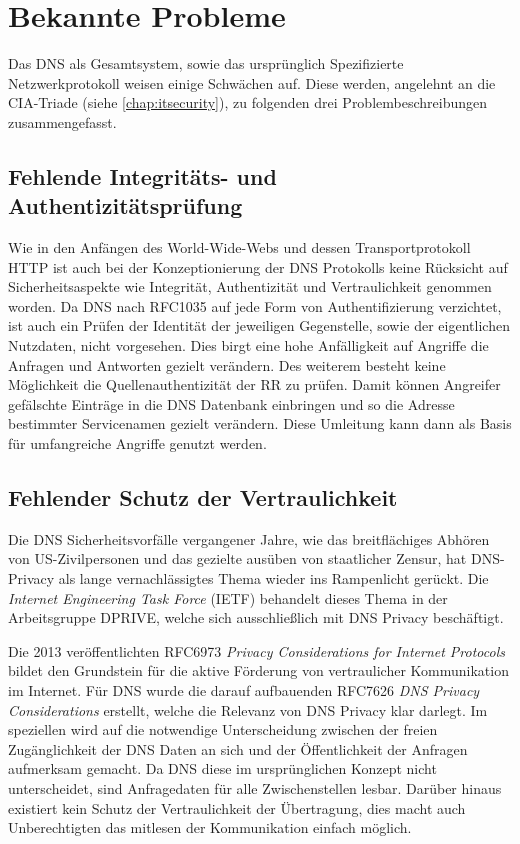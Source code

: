 \chapter{Bekannte Probleme}
\label{chap:threads}

Das DNS als Gesamtsystem, sowie das ursprünglich Spezifizierte Netzwerkprotokoll weisen einige Schwächen auf. Diese werden, angelehnt an die CIA-Triade (siehe \ref{chap:itsecurity}), zu folgenden drei Problembeschreibungen zusammengefasst.   

\section{Fehlende Integritäts- und Authentizitätsprüfung}
\label{sec:thread-auth}

Wie in den Anfängen des World-Wide-Webs und dessen Transportprotokoll HTTP ist auch bei der Konzeptionierung der DNS Protokolls keine Rücksicht auf Sicherheitsaspekte wie Integrität, Authentizität und Vertraulichkeit genommen worden. Da DNS nach RFC1035\cite{rfc1035} auf jede Form von Authentifizierung verzichtet, ist auch ein Prüfen der Identität der jeweiligen Gegenstelle, sowie der eigentlichen Nutzdaten, nicht vorgesehen. Dies birgt eine hohe Anfälligkeit auf Angriffe die Anfragen und Antworten gezielt verändern. Des weiterem besteht keine Möglichkeit die Quellenauthentizität der RR zu prüfen. Damit können Angreifer gefälschte Einträge in die DNS Datenbank einbringen und so die Adresse bestimmter Servicenamen gezielt verändern. Diese Umleitung kann dann als Basis für umfangreiche Angriffe genutzt werden.

\section{Fehlender Schutz der Vertraulichkeit}
\label{sec:thread-priv}

Die DNS Sicherheitsvorfälle vergangener Jahre, wie das breitflächiges Abhören von US-Zivilpersonen\cite{Greenwald2013} und das gezielte ausüben von staatlicher Zensur\cite{turkybbc2017}\cite{turkywp2018}, hat DNS-Privacy als lange vernachlässigtes Thema wieder ins Rampenlicht gerückt. Die \textit{Internet Engineering Task Force} (IETF) behandelt dieses Thema in der Arbeitsgruppe DPRIVE, welche sich ausschließlich mit DNS Privacy beschäftigt. 

Die 2013 veröffentlichten RFC6973 \textit{Privacy Considerations for Internet Protocols}\cite{rfc6973} bildet den Grundstein für die aktive Förderung von vertraulicher Kommunikation im Internet. Für DNS wurde die darauf aufbauenden RFC7626 \textit{DNS Privacy Considerations}\cite{rfc7626} erstellt, welche die Relevanz von DNS Privacy klar darlegt. Im speziellen wird auf die notwendige Unterscheidung zwischen der freien Zugänglichkeit der DNS Daten an sich und der Öffentlichkeit der Anfragen aufmerksam gemacht. Da DNS diese im ursprünglichen Konzept nicht unterscheidet, sind Anfragedaten für alle Zwischenstellen lesbar. Darüber hinaus existiert kein Schutz der Vertraulichkeit der Übertragung, dies macht auch Unberechtigten das mitlesen der Kommunikation einfach möglich.

